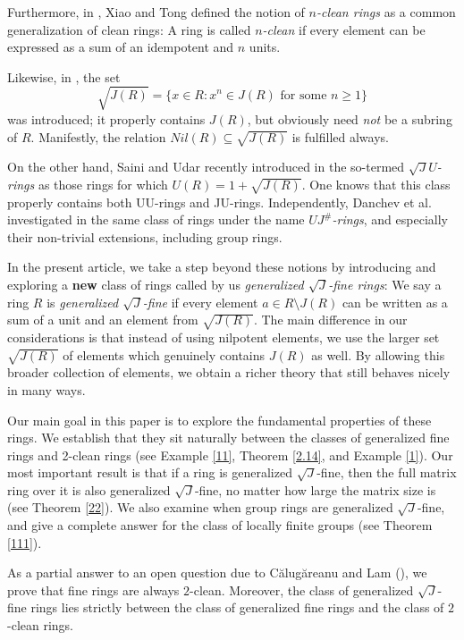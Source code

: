 \documentclass[12pt]{amsart}
\theoremstyle{definition}
\begin{document}
Furthermore, in \cite{xi}, Xiao and Tong defined the notion of \textit{\(n\)-clean rings} as a common generalization of clean rings: A ring is called \textit{\(n\)-clean} if every element can be expressed as a sum of an idempotent and \(n\) units.

Likewise, in \cite{wang}, the set
\[
\sqrt{J(R)} = \{ x \in R : x^{n} \in J(R) \text{ for some } n \ge 1 \}
\]
was introduced; it properly contains \( J(R) \), but obviously need \textit{not} be a subring of \( R \). Manifestly, the relation \( Nil(R) \subseteq \sqrt{J(R)} \) is fulfilled always.

On the other hand, Saini and Udar recently introduced in \cite{SU} the so-termed \textit{\(\sqrt{J}U\)-rings} as those rings for which \( U(R) = 1 + \sqrt{J(R)} \). One knows that this class properly contains both UU-rings and JU-rings.
Independently, Danchev et al. investigated in \cite{DDE} the same class of rings under the name \textit{\(UJ^\#\)-rings}, and especially their non-trivial extensions, including group rings.

In the present article, we take a step beyond these notions by introducing and exploring a \textbf{new} class of rings called by us \textit{generalized $\sqrt{J}$-fine rings}: We say a ring $R$ is \textit{generalized $\sqrt{J}$-fine} if every element \( a \in R \setminus J(R) \) can be written as a sum of a unit and an element from $\sqrt{J(R)}$. The main difference in our considerations is that instead of using nilpotent elements, we use the larger set $\sqrt{J(R)}$ of elements which genuinely contains \( J(R) \) as well. By allowing this broader collection of elements, we obtain a richer theory that still behaves nicely in many ways.

Our main goal in this paper is to explore the fundamental properties of these rings. We establish that they sit naturally between the classes of generalized fine rings and 2-clean rings (see Example \ref{11}, Theorem \ref{2.14}, and Example \ref{1}). Our most important result is that if a ring is generalized $\sqrt{J}$-fine, then the full matrix ring over it is also generalized $\sqrt{J}$-fine, no matter how large the matrix size is (see Theorem \ref{22}). We also examine when group rings are generalized $\sqrt{J}$-fine, and give a complete answer for the class of locally finite groups (see Theorem \ref{111}).

As a partial answer to an open question due to C\u{a}lug\u{a}reanu and Lam (\cite[Question 5.19]{Clam}), we prove that fine rings are always \(2\)-clean. Moreover, the class of generalized $\sqrt{J}$-fine rings lies strictly between the class of generalized fine rings and the class of \(2\)-clean rings.
\end{document}
